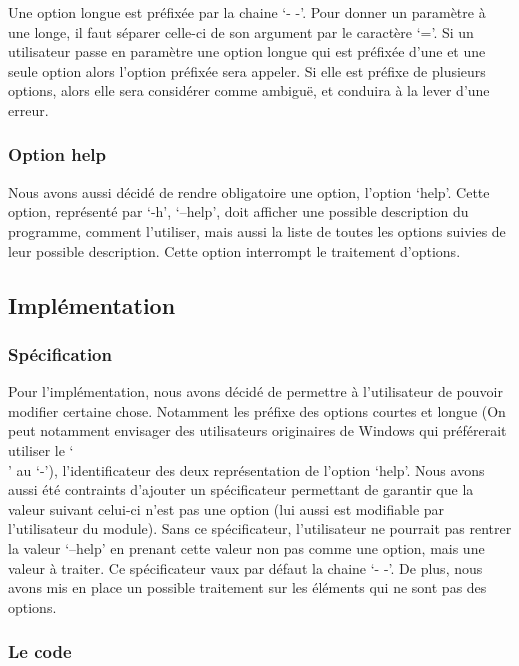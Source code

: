 \documentclass[12pt]{article}
\begin{document}
    Une option longue est préfixée par la chaine `- -'. Pour donner un paramètre 
    à une longe, il faut séparer celle-ci de son argument par le caractère `='. 
    Si un utilisateur passe en paramètre une option longue qui est préfixée d'une
    et une seule option alors l'option préfixée sera appeler. Si elle est préfixe 
    de plusieurs options, alors elle sera considérer comme ambiguë, et conduira à 
    la lever d'une erreur.

    \subsubsection{Option help}

    Nous avons aussi décidé de rendre obligatoire une option, l'option `help'.
    Cette option, représenté par `-h', `--help', doit afficher une possible 
    description du programme, comment l'utiliser, mais aussi la liste de toutes 
    les options suivies de leur possible description. Cette option interrompt le 
    traitement d'options. 

    \subsection{Implémentation}

    \subsubsection{Spécification}

    Pour l'implémentation, nous avons décidé de permettre à l'utilisateur de 
    pouvoir modifier certaine chose. Notamment les préfixe des options courtes et 
    longue (On peut notamment envisager des utilisateurs originaires de Windows qui 
    préférerait utiliser le `\\' au `-'), l'identificateur des deux 
    représentation de l'option `help'. Nous avons aussi été contraints d'ajouter 
    un spécificateur permettant de garantir que la valeur suivant celui-ci n'est pas
    une option (lui aussi est modifiable par l'utilisateur du module). Sans ce 
    spécificateur, l'utilisateur ne pourrait pas rentrer la valeur `--help' en 
    prenant cette valeur non pas comme une option, mais une valeur à traiter. Ce 
    spécificateur vaux par défaut la chaine `- -'. De plus, nous avons mis en place 
    un possible traitement sur les éléments qui ne sont pas des options.
    
    \subsubsection{Le code}
\end{document}
